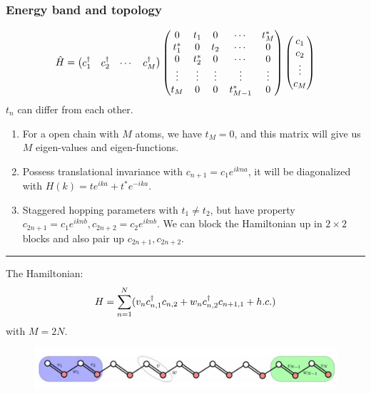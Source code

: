 \documentclass[letterpaper,10pt,english]{sphinxmanual}
\begin{document}
\subsubsection{Energy band and topology}
\label{TI/Lecture notes/1:energy-band-and-topology}\begin{gather}
\begin{split}\hat{H}=\begin{pmatrix}c_1^\dagger&c_2^\dagger&\cdots&c_M^\dagger \end{pmatrix}\begin{pmatrix} 0 & t_1 &0 & \cdots&t_M^*\\
t_1^* &0&t_2&\cdots&0\\
0&t_2^*&0&\cdots&0\\
\vdots&\vdots&\vdots&\vdots&\vdots\\
t_M&0&0&t_{M-1}^*&0
\end{pmatrix}\begin{pmatrix}c_1\\c_2\\\vdots\\c_M\end{pmatrix}\end{split}\notag
\end{gather}
\(t_n\) can differ from each other.
\begin{enumerate}
\item {} 
For a open chain with \(M\) atoms, we have \(t_M=0\), and
this matrix will give us \(M\) eigen-values and eigen-functions.

\item {} 
Possess translational invariance with \(c_{n+1}=c_1e^{ikna}\), it
will be diagonalized with \(H(k)=te^{ika}+t^*e^{-ika}\).

\item {} 
Staggered hopping parameters with \(t_1\neq t_2\), but have
property \(c_{2n+1}=c_1e^{iknb},c_{2n+2}=c_2e^{iknb}\). We can
block the Hamiltonian up in \(2\times 2\) blocks and also pair up
\(c_{2n+1},c_{2n+2}\).

\end{enumerate}


\bigskip\hrule{}\bigskip


The Hamiltonian:
\begin{gather}
\begin{split}H=\sum_{n=1}^N(v_n c_{n,1}^\dagger c_{n,2}+w_nc_{n,2}^\dagger c_{n+1,1}+h.c.)\end{split}\notag
\end{gather}
with \(M=2N\).
\begin{figure}[htbp]
\centering

\includegraphics[width=0.700\linewidth]{2.jpg}
\end{figure}
\end{document}
